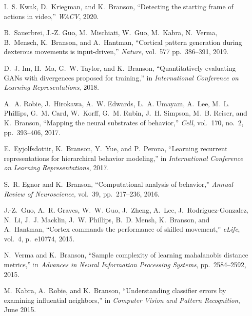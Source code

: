 \begin{cvenum}

\item I.~S. Kwak, D.~Kriegman, and K.~Branson, ``Detecting the starting frame of actions in video,'' {\em WACV}, 2020.
  
\item B.~Sauerbrei, J.-Z. Guo, M.~Mischiati, W.~Guo, M.~Kabra, N.~Verma, B.~Mensch, K.~Branson, and A.~Hantman, ``Cortical pattern generation during dexterous movements is input-driven,'' {\em Nature}, vol.~577 pp.~386--391, 2019.

\item D.~J. Im, H.~Ma, G.~W. Taylor, and K.~Branson,
  ``Quantitatively evaluating {GAN}s with divergences proposed for training,''
  in {\em International Conference on Learning Representations},
  2018.
  
\item A.~A. Robie, J.~Hirokawa, A.~W. Edwards, L.~A. Umayam,
  A.~Lee, M.~L. Phillips, G.~M. Card, W.~Korff, G.~M. Rubin, J.~H. Simpson,
  M.~B. Reiser, and K.~Branson, ``Mapping the neural substrates of behavior,''
  {\em Cell}, vol.~170, no.~2, pp.~393--406, 2017.

\item E.~Eyjolfsdottir, K.~Branson, Y.~Yue, and P.~Perona,
  ``Learning recurrent representations for hierarchical behavior modeling,'' in {\em International Conference on Learning Representations}, 2017.

\item S.~R. Egnor and K.~Branson, ``Computational analysis of behavior,'' {\em Annual Review of Neuroscience}, vol.~39, pp.~217--236, 2016.

\item J.-Z.~Guo, A.~R. Graves, W.~W. Guo, J.~Zheng, A.~Lee,
  J.~Rodriguez-Gonzalez, N.~Li, J.~J. Macklin, J.~W. Phillips, B.~D. Mensh,
  K.~Branson, and A.~Hantman, ``Cortex commands the performance of skilled
  movement,'' {\em e{L}ife}, vol.~4, p.~e10774, 2015.

\item N.~Verma and K.~Branson, ``Sample complexity of learning mahalanobis distance metrics,'' in {\em Advances in Neural Information Processing Systems}, pp.~2584--2592, 2015.
  
\item M.~Kabra, A.~Robie, and K.~Branson, ``Understanding classifier errors by
  examining influential neighbors,'' in {\em Computer Vision and Pattern
  Recognition}, June 2015.


\end{cvenum}
